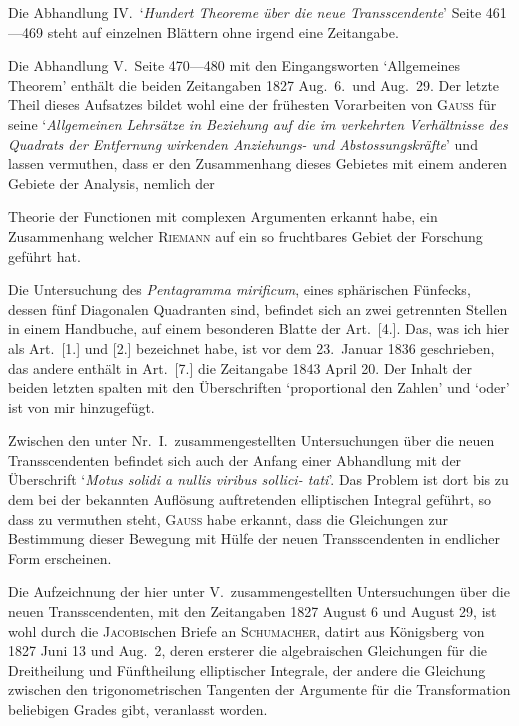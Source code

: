 \documentclass[12pt,a4paper]{article}
\begin{document}
Die Abhandlung IV.\ `\textit{Hundert Theoreme \"uber die neue Transscendente}' Seite 461---469 steht auf
einzelnen Bl\"attern ohne irgend eine Zeitangabe.

Die Abhandlung V.\ Seite 470---480 mit den Eingangsworten `Allgemeines Theorem' enth\"alt die beiden Zeitangaben 1827 Aug.\ 6.\ und Aug.\ 29. Der letzte Theil dieses Aufsatzes bildet wohl eine der fr\"uhesten Vorarbeiten von \textsc{Gau\ss} f\"ur seine `\textit{Allgemeinen Lehrs\"atze in Beziehung auf die im verkehrten Verh\"altnisse des Quadrats der Entfernung wirkenden Anziehungs- und Abstossungskr\"afte}' und lassen vermuthen, dass er den Zusammenhang dieses Gebietes mit einem anderen Gebiete der Analysis, nemlich der

\newpage
\noindent Theorie der Functionen mit complexen Argumenten erkannt habe, ein Zusammenhang welcher \textsc{Riemann}
auf ein so fruchtbares Gebiet der Forschung gef\"uhrt hat.

Die Untersuchung des \textit{Pentagramma mirificum}, eines sph\"arischen F\"unfecks, dessen f\"unf Diagonalen
Quadranten sind, befindet sich an zwei getrennten Stellen in einem Handbuche, auf einem besonderen
Blatte der Art.~[4.]. Das, was ich hier als Art.~[1.] und [2.] bezeichnet habe, ist vor dem 23.\ Januar
1836 geschrieben, das andere enth\"alt in Art.~[7.] die Zeitangabe 1843 April 20. Der Inhalt der beiden
letzten spalten mit den \"Uberschriften `proportional den Zahlen' und `oder' ist von mir hinzugef\"ugt.

Zwischen den unter Nr.\ I.\ zusammengestellten Untersuchungen \"uber die neuen Transscendenten befindet sich auch der Anfang einer Abhandlung mit der \"Uberschrift `\textit{Motus solidi a nullis viribus sollici-\linebreak
\hspace*{\fill} tati}'. Das Problem ist dort bis zu dem bei der bekannten Aufl\"osung auftretenden elliptischen Integral
gef\"uhrt, so dass zu vermuthen steht, \textsc{Gau\ss} habe erkannt, dass die Gleichungen zur Bestimmung dieser
Bewegung mit H\"ulfe der neuen Transscendenten in endlicher Form erscheinen.

Die Aufzeichnung der hier unter V.\ zusammengestellten Untersuchungen \"uber die neuen Transscendenten, mit den Zeitangaben 1827 August 6 und August 29, ist wohl durch die \textsc{Jacobi}schen Briefe
an \textsc{Schumacher}, datirt aus K\"onigsberg von 1827 Juni 13 und Aug.\ 2, deren ersterer die algebraischen Gleichungen f\"ur die Dreitheilung und F\"unftheilung elliptischer Integrale, der andere die Gleichung zwischen den trigonometrischen Tangenten der Argumente f\"ur die Transformation beliebigen Grades gibt, veranlasst worden.
\end{document}
